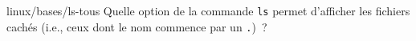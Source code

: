 \begin{question}{linux/bases/ls-tous}
  Quelle option de la commande {\tt ls} permet d'afficher les fichiers
  cachés (i.e., ceux dont le nom commence par un {\tt .})~?
  \begin{reponses}
    \lastchoices
  \end{reponses}
\end{question}
